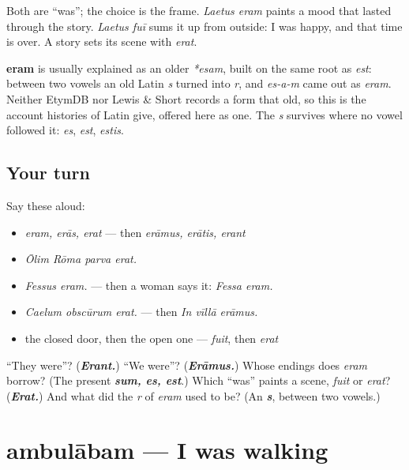 \begin{culture}
Both are \textquotedblleft{}was\textquotedblright{}; the choice is the frame. \emph{Laetus eram} paints a mood that lasted through the story. \emph{Laetus fuī} sums it up from outside: I was happy, and that time is over. A story sets its scene with \emph{erat}.
\end{culture}

\begin{cousinweb}
\textbf{eram} is usually explained as an older \emph{*esam}, built on the same root as \emph{est}: between two vowels an old Latin \emph{s} turned into \emph{r}, and \emph{es-a-m} came out as \emph{eram}. Neither EtymDB nor Lewis \& Short records a form that old, so this is the account histories of Latin give, offered here as one. The \emph{s} survives where no vowel followed it: \emph{es}, \emph{est}, \emph{estis}.
\end{cousinweb}

\subsection*{Your turn}
Say these aloud:

\begin{itemize}
\raggedright
  \item \emph{eram, erās, erat} — then \emph{erāmus, erātis, erant}
  \item \emph{Ōlim Rōma parva erat.}
  \item \emph{Fessus eram.} — then a woman says it: \emph{Fessa eram.}
  \item \emph{Caelum obscūrum erat.} — then \emph{In vīllā erāmus.}
  \item the closed door, then the open one — \emph{fuit}, then \emph{erat}
\end{itemize}

\begin{tcolorbox}[breakable,colback=teal!4,colframe=teal!35!black,title={Before you move on}]
\textquotedblleft{}They were\textquotedblright{}? (\emph{\textbf{Erant.}}) \textquotedblleft{}We were\textquotedblright{}? (\emph{\textbf{Erāmus.}}) Whose endings does \emph{eram} borrow? (The present \emph{\textbf{sum, es, est}}.) Which \textquotedblleft{}was\textquotedblright{} paints a scene, \emph{fuit} or \emph{erat}? (\emph{\textbf{Erat.}}) And what did the \emph{r} of \emph{eram} used to be? (An \emph{\textbf{s}}, between two vowels.)
\end{tcolorbox}
\section[ambulābam, habēbam, legēbam]{ambulābam — I was walking}

